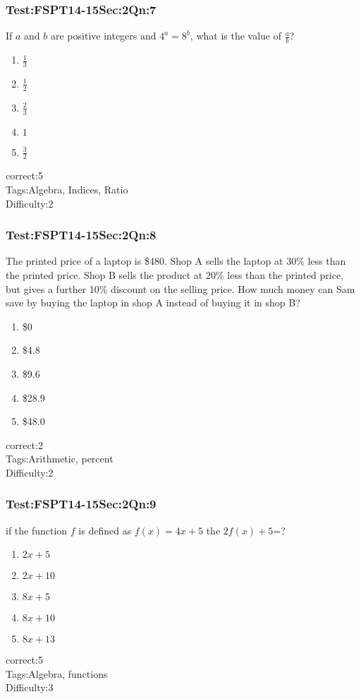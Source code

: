 \documentclass[]{beamer}
\begin{document}
    \begin{frame}
	    \frametitle{Test:FSPT14-15\hspace{2mm}Sec:2\hspace{2mm}Qn:7}
	       If $a$ and $b$ are positive integers and $4^a=8^b$, what is the value of $\frac{a}{b}$?
	    \begin{enumerate}
	        \item
	            $\frac{1}{3}$
	        \item
	            $\frac{1}{2}$
	        \item
	            $\frac{2}{3}$
	        \item
	            $1$
	        \item
	            $\frac{3}{2}$
	    \end{enumerate}
	    correct:5  \\   
	    Tags:Algebra, Indices, Ratio    \\
	    Difficulty:2   \\
    \end{frame}
    \begin{frame}
	    \frametitle{Test:FSPT14-15\hspace{2mm}Sec:2\hspace{2mm}Qn:8}
The printed price of a laptop is \$480. Shop A sells the laptop at 30\% less than the printed price. Shop B sells the product at 20\% less than the printed price, but gives a further 10\% discount on the selling price. How much money can Sam save by buying the laptop in shop A instead of buying it in shop B?	       
	    \begin{enumerate}
	        \item
	            \$0
	        \item
	            \$4.8
	        \item
	            \$9.6
	        \item
	            \$28.9
	        \item
	            \$48.0
	    \end{enumerate}
	    correct:2  \\   
	    Tags:Arithmetic, percent    \\
	    Difficulty:2   \\
    \end{frame}
    \begin{frame}
	    \frametitle{Test:FSPT14-15\hspace{2mm}Sec:2\hspace{2mm}Qn:9}
	    if the function $f$ is defined as $f(x)=4x+5$ the $2f(x)+5$=?      
	    \begin{enumerate}
	        \item
	            $2x+5$	
	        \item
	            $2x+10$
	        \item
	            $8x+5$
	        \item
	            $8x+10$
	        \item
	            $8x+13$
	    \end{enumerate}
	    correct:5  \\   
	    Tags:Algebra, functions    \\
	    Difficulty:3   \\
    \end{frame}
\end{document}
